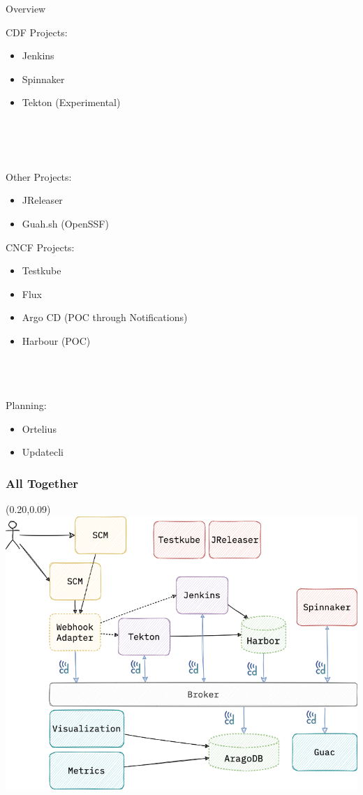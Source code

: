 \documentclass[aspectratio=169,11pt,hyperref={colorlinks=true}]{beamer}
\begin{document}
\begin{3squares}{Overview}{%
    CDF Projects:
    \begin{itemize}
      \item Jenkins
      \item Spinnaker
      \item Tekton (Experimental)
    \end{itemize}
    ~ \\
    ~ \\
    ~ \\
  }{%
  Other Projects:
  \begin{itemize}
    \item JReleaser
    \item Guah.sh (OpenSSF)
  \end{itemize}
  }{%
  CNCF Projects:
  \begin{itemize}
    \item Testkube
    \item Flux
    \item Argo CD (POC through Notifications)
    \item Harbour (POC)
  \end{itemize}
  ~ \\
  ~ \\
  ~ \\
  Planning:
  \begin{itemize}
    \item Ortelius
    \item Updatecli
  \end{itemize}
  }
\end{3squares}

\begin{grayframe}
  \frametitle{All Together}
  \begin{textblock*}{0.60\paperwidth}(0.20\paperwidth,0.09\paperheight)
    \includegraphics[width=0.60\paperwidth]{img/cdevents-poc.png}
  \end{textblock*}
\end{grayframe}
\end{document}
